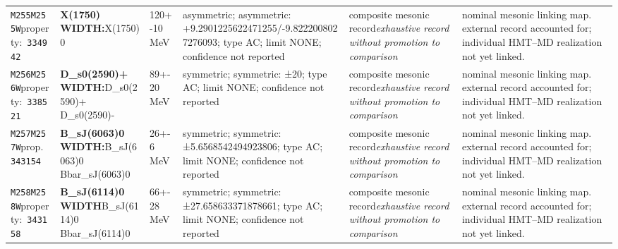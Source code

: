 \begin{landscape}
\begin{longtable}{L{1.85cm}L{4.45cm}L{2.35cm}L{4.05cm}L{3.35cm}L{7.15cm}}
\texttt{M255}\newline \texttt{M255W}\newline property:\ \texttt{334942} & \textbf{X(1750) WIDTH:}\newline X(1750)0 & 120+-10\,MeV & asymmetric; asymmetric: +9.2901225622471255/-9.8222008027276093; type AC; limit NONE; confidence not reported & composite mesonic record\newline \emph{exhaustive record without promotion to comparison} & nominal mesonic linking map. external record accounted for; individual HMT--MD realization not yet linked. \\
\texttt{M256}\newline \texttt{M256W}\newline property:\ \texttt{338521} & \textbf{D\_\allowbreak{}s0(2590)+ WIDTH:}\newline D\_\allowbreak{}s0(2590)+ \textbar{}\allowbreak{} D\_\allowbreak{}s0(2590)- & 89+-20\,MeV & symmetric; symmetric: ±20; type AC; limit NONE; confidence not reported & composite mesonic record\newline \emph{exhaustive record without promotion to comparison} & nominal mesonic linking map. external record accounted for; individual HMT--MD realization not yet linked. \\
\texttt{M257}\newline \texttt{M257W}\newline prop.\ \texttt{343154} & \textbf{B\_\allowbreak{}sJ(6063)0 WIDTH:}\newline B\_\allowbreak{}sJ(6063)0 \textbar{}\allowbreak{} Bbar\_\allowbreak{}sJ(6063)0 & 26+-6\,MeV & symmetric; symmetric: ±5.6568542494923806; type AC; limit NONE; confidence not reported & composite mesonic record\newline \emph{exhaustive record without promotion to comparison} & nominal mesonic linking map. external record accounted for; individual HMT--MD realization not yet linked. \\
\texttt{M258}\newline \texttt{M258W}\newline property:\ \texttt{343158} & \textbf{B\_\allowbreak{}sJ(6114)0 WIDTH}\newline B\_\allowbreak{}sJ(6114)0 \textbar{}\allowbreak{} Bbar\_\allowbreak{}sJ(6114)0 & 66+-28\,MeV & symmetric; symmetric: ±27.658633371878661; type AC; limit NONE; confidence not reported & composite mesonic record\newline \emph{exhaustive record without promotion to comparison} & nominal mesonic linking map. external record accounted for; individual HMT--MD realization not yet linked. \\

\end{longtable}
\end{landscape}
